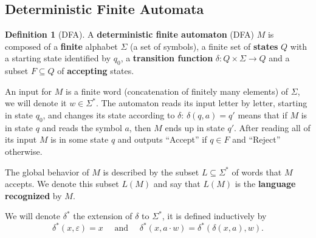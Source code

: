 \documentclass{article}
\theoremstyle{definition}
\newtheorem{defn}[thm]{Definition}
\theoremstyle{remark}
\begin{document}
\subsection{Deterministic Finite Automata}
\begin{defn}[DFA]
	A \textbf{deterministic finite automaton} (DFA) $M$ is composed of a \textbf{finite} alphabet $\Sigma$ (a set of symbols), a finite set of \textbf{states} $Q$ with a starting state identified by $q_0$, a \textbf{transition function} $\delta: Q\times \Sigma \rightarrow Q$ and a subset $F \subseteq Q$ of \textbf{accepting} states. 
	
	An input for $M$ is a finite word (concatenation of finitely many elements) of $\Sigma$, we will denote it $w \in \Sigma^*$. The automaton reads its input letter by letter, starting in state $q_0$, and changes its state according to $\delta$: $\delta(q, a) = q'$ means that if $M$ is in state $q$ and reads the symbol $a$, then $M$ ends up in state $q'$. After reading all of its input $M$ is in some state $q$ and outputs ``Accept'' if $q \in F$ and ``Reject'' otherwise.
	
	The global behavior of $M$ is described by the subset $L \subseteq \Sigma^*$ of words that $M$ accepts. We denote this subset $L(M)$ and say that $L(M)$ is the \textbf{language recognized} by $M$.
	
	We will denote $\delta^*$ the extension of $\delta$ to $\Sigma^*$, it is defined inductively by 
	\[\delta^*(x,\varepsilon) = x \quad \text{ and } \quad \delta^*(x,a\cdot w) = \delta^*(\delta(x,a),w).\]
\end{defn}
\end{document}

